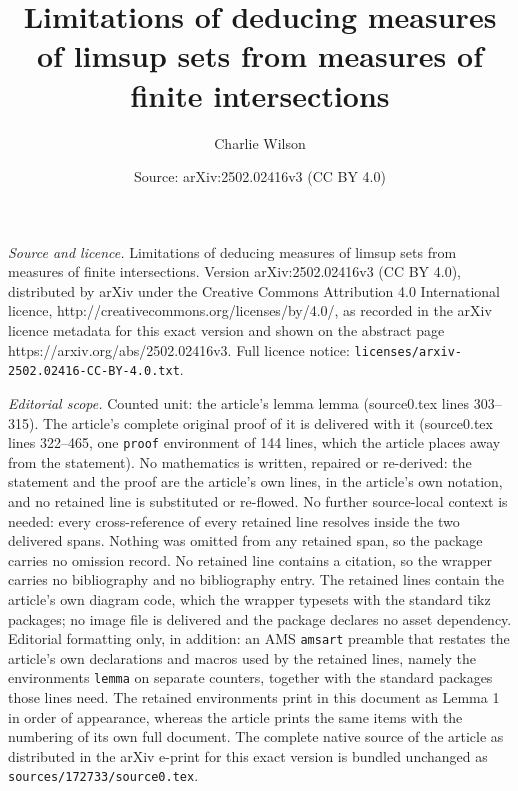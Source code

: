 \documentclass[10pt,a4paper]{amsart}
\title{Limitations of deducing measures of limsup sets from measures of finite intersections}
\author{Charlie Wilson}
\date{Source: arXiv:2502.02416v3 (CC BY 4.0)}
\begin{document}
\maketitle

\noindent\emph{Source and licence.} Limitations of deducing measures of limsup sets from measures of finite intersections. Version arXiv:2502.02416v3 (CC BY 4.0), distributed by arXiv under the Creative Commons Attribution 4.0 International licence, http://creativecommons.org/licenses/by/4.0/, as recorded in the arXiv licence metadata for this exact version and shown on the abstract page https://arxiv.org/abs/2502.02416v3. Full licence notice: \texttt{licenses/arxiv-2502.02416-CC-BY-4.0.txt}.\par\smallskip

\noindent\textit{Editorial scope.} Counted unit: the article's lemma lemma (source0.tex lines 303--315). The article's complete original proof of it is delivered with it (source0.tex lines 322--465, one \texttt{proof} environment of 144 lines, which the article places away from the statement). No mathematics is written, repaired or re-derived: the statement and the proof are the article's own lines, in the article's own notation, and no retained line is substituted or re-flowed.  No further source-local context is needed: every cross-reference of every retained line resolves inside the two delivered spans.  Nothing was omitted from any retained span, so the package carries no omission record.  No retained line contains a citation, so the wrapper carries no bibliography and no bibliography entry.  The retained lines contain the article's own diagram code, which the wrapper typesets with the standard tikz packages; no image file is delivered and the package declares no asset dependency.  Editorial formatting only, in addition: an AMS \texttt{amsart} preamble that restates the article's own declarations and macros used by the retained lines, namely the environments \texttt{lemma} on separate counters, together with the standard packages those lines need.  The retained environments print in this document as Lemma 1 in order of appearance, whereas the article prints the same items with the numbering of its own full document.  The complete native source of the article as distributed in the arXiv e-print for this exact version is bundled unchanged as \texttt{sources/172733/source0.tex}.
\end{document}

